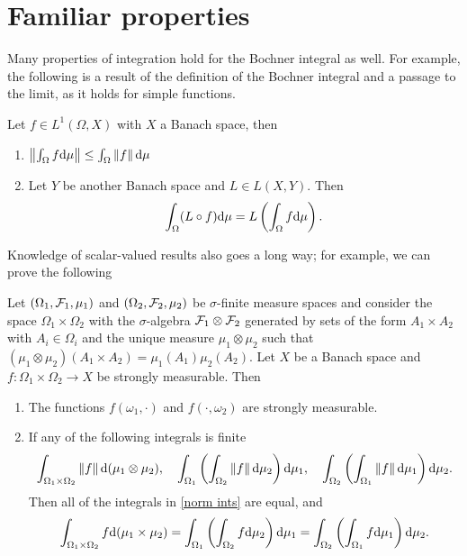 \documentclass[
    a4paper,
    DIV=14,
    abstract=true,
    numbers=noenddot
]{scrartcl}
\begin{document}
\section{Familiar properties}
Many properties of integration hold for the Bochner integral as well.
For example, the following is a result of the definition of the Bochner integral and a passage to the limit, as it holds for simple functions.
\begin{corollary}\label{corollary easy}
	Let $f\in L^1(\Omega,X)$ with $X$ a Banach space, then
	\begin{enumerate}
		\item $\left\lVert \int_\Omega f \mathrm{d}\mu \right\rVert\leq\int_\Omega{\left\lVert f \right\rVert\mathrm{d}\mu} $
		\item Let $Y$ be another Banach space and $L\in L(X,Y)$. Then
		      \begin{align*}
			      \int_\Omega (L\circ f) \mathrm{d}\mu=L\left(\int_\Omega f \mathrm{d}\mu\right).
		      \end{align*}
	\end{enumerate}
\end{corollary}
Knowledge of scalar-valued results also goes a long way; for example, we can prove the following
\begin{exercise}\label{ex:fubini}
	Let $(\Omega_1, \mathcal{F} _1 , \mu _1 ) $ and $(\Omega_2, \mathcal{F} _2 , \mu _2 ) $ be $\sigma $-finite measure spaces and consider the space $\Omega_1\times \Omega_2 $ with the $\sigma $-algebra $\mathcal{F} _1 \otimes \mathcal{F} _2$ generated by sets of the form $A_1 \times A_2$ with $A_i \in \Omega _i$ and the unique measure $\mu _1 \otimes \mu _2$ such that $(\mu _1 \otimes \mu _2)(A_1 \times A_2)=\mu _1(A_1)\mu _2(A_2)$. Let $X$ be a Banach space and $f:\Omega_1\times \Omega_2 \to X$ be strongly measurable. Then
	\begin{enumerate}
		\item The functions $f(\omega_1,\cdot )$ and $f(\cdot,\omega_2)$ are strongly measurable.
		\item If any of the following integrals is finite
		      \begin{align}\label{norm ints}
			      \int_{\Omega_1 \times \Omega _2} \left\lVert f \right\rVert \mathrm{d} (\mu_1 \otimes \mu _2), \quad  \int_{\Omega_1}\left(\int_{\Omega_2} \left\lVert f \right\rVert\mathrm{d}\mu_2\right)\mathrm{d}\mu_1, \quad \int_{\Omega_2}\left(\int_{\Omega_1} \left\lVert f \right\rVert\mathrm{d}\mu_1\right)\mathrm{d}\mu_2.
		      \end{align}
		      Then all of the integrals in \eqref{norm ints} are equal, and
		      \begin{align}\label{ints}
			      \int_{\Omega_1 \times \Omega _2} f \mathrm{d} (\mu_1 \times \mu _2)= \int_{\Omega_1}\left(\int_{\Omega_2} f\mathrm{d}\mu_2\right)\mathrm{d}\mu_1=\int_{\Omega_2}\left(\int_{\Omega_1} f\mathrm{d}\mu_1\right)\mathrm{d}\mu_2.
		      \end{align}
	\end{enumerate}
\end{exercise}
\end{document}
